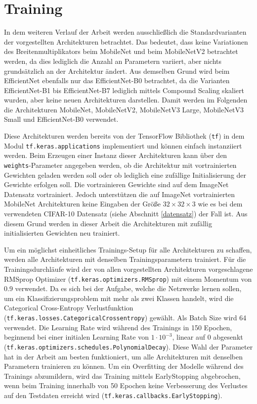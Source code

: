 \section{Training}
\label{training}
In dem weiteren Verlauf der Arbeit werden ausschließlich die Standardvarianten der vorgestellten Architekturen betrachtet. Das bedeutet, dass keine Variationen des Breitenmultiplikators beim MobileNet und beim MobileNetV2 betrachtet werden, da dies lediglich die Anzahl an Parametern variiert, aber nichts grundsätzlich an der Architektur ändert. Aus demselben Grund wird beim EfficientNet ebenfalls nur das EfficientNet-B0 betrachtet, da die Varianten EfficientNet-B1 bis EfficientNet-B7 lediglich mittels Compound Scaling skaliert wurden, aber keine neuen Architekturen darstellen. Damit werden im Folgenden die Architekturen MobileNet, MobileNetV2, MobileNetV3 Large, MobileNetV3 Small und EfficientNet-B0 verwendet.

Diese Architekturen werden bereits von der TensorFlow Bibliothek (\lstinline{tf}) in dem Modul \lstinline{tf.keras.applications} implementiert und können einfach instanziiert werden. Beim Erzeugen einer Instanz dieser Architekturen kann über den \lstinline{weights}-Parameter angegeben werden, ob die Architektur mit vortrainierten Gewichten geladen werden soll oder ob lediglich eine zufällige Initialisierung der Gewichte erfolgen soll. Die vortrainieren Gewichte sind auf dem ImageNet Datensatz \cite{russakovsky_imagenet_2015} vortrainiert. Jedoch unterstützen die auf ImageNet vortrainierten MobileNet Architekturen keine Eingaben der Größe $32 \times 32 \times 3$ wie es bei dem verwendeten CIFAR-10 Datensatz (siehe Abschnitt \ref{datensatz}) der Fall ist. Aus diesem Grund werden in dieser Arbeit die Architekturen mit zufällig initialisierten Gewichten neu trainiert.

Um ein möglichst einheitliches Trainings-Setup für alle Architekturen zu schaffen, werden alle Architekturen mit denselben Trainingsparametern trainiert. Für die Trainingsdurchläufe wird der von allen vorgestellten Architekturen vorgeschlagene RMSprop Optimizer (\lstinline{tf.keras.optimizers.RMSprop}) \cite{howard_mobilenets_2017, sandler_mobilenetv2_2019, howard_searching_2019, tan_efficientnet_2020} mit einem Momentum von 0.9 verwendet. Da es sich bei der Aufgabe, welche die Netzwerke lernen sollen, um ein Klassifizierungsproblem mit mehr als zwei Klassen handelt, wird die Categorical Cross-Entropy Verlustfunktion (\lstinline{tf.keras.losses.CategoricalCrossentropy}) gewählt. Als Batch Size wird 64 verwendet. Die Learning Rate wird während des Trainings in 150 Epochen, beginnend bei einer initialen Learning Rate von $1 \cdot 10^{-3}$, linear auf 0 abgesenkt (\lstinline{tf.keras.optimizers.schedules.PolynomialDecay}). Diese Wahl der Parameter hat in der Arbeit am besten funktioniert, um alle Architekturen mit denselben Parametern trainieren zu können. Um ein Overfitting der Modelle während des Trainings abzumildern, wird das Training mittels EarlyStopping abgebrochen, wenn beim Training innerhalb von 50 Epochen keine Verbesserung des Verlustes auf den Testdaten erreicht wird (\lstinline{tf.keras.callbacks.EarlyStopping}).

